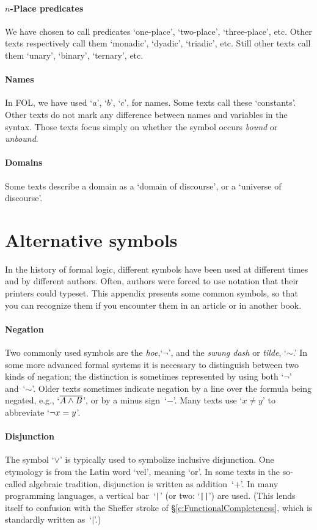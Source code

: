 \paragraph{$n$-Place predicates} We have chosen to call predicates `one-place', `two-place', `three-place', etc. Other texts respectively call them `monadic', `dyadic', `triadic', etc. Still other texts call them `unary', `binary', `ternary', etc.

\paragraph{Names} In FOL, we have used `$a$', `$b$', `$c$', for names. Some texts call these `constants'. Other texts do not mark any difference between names and variables in the syntax. Those texts focus simply on  whether the symbol occurs \emph{bound} or \emph{unbound}.

\paragraph{Domains} Some texts describe a domain as a `domain of discourse', or a `universe of discourse'.

\section{Alternative symbols}
In the history of formal logic, different symbols have been used at different times and by different authors. Often, authors were forced to use notation that their printers could typeset. This appendix presents some common symbols, so that you can recognize them if you encounter them in an article or in another book.

\paragraph{Negation} Two commonly used symbols are the
\emph{hoe},`$\neg$', and the \emph{swung dash} or \emph{tilde},
`${\sim}$.' In some more advanced formal systems it is necessary to
distinguish between two kinds of negation; the distinction is
sometimes represented by using both `$\neg$' and~`${\sim}$'. Older
texts sometimes indicate negation by a line over the formula being
negated, e.g., `$\overline{A \wedge B}$', or by a minus sign~`$-$'.
Many texts use `$x \neq y$' to abbreviate `$\neg x = y$'.

\paragraph{Disjunction} The symbol `$\vee$' is typically used to
symbolize inclusive disjunction. One etymology is from the Latin word
`vel', meaning `or'. In some texts in the so-called algebraic
tradition, disjunction is written as addition~`$+$'. In many
programming languages, a vertical bar~`\verb+|+' (or two: `\verb+||+')
are used. (This lends itself to confusion with the Sheffer stroke of
\S\ref{c:FunctionalCompleteness}, which is standardly written
as~`$\mid$'.)

